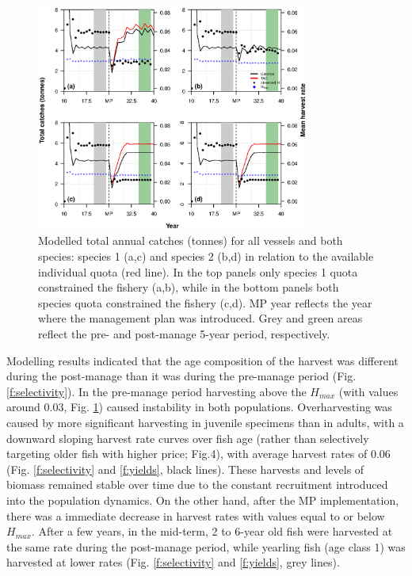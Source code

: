 \documentclass[12pt,oneline,a4paper,numbib]{ouparticle}
\numberwithin{equation}{subsection} %
\begin{document}
\begin{figure}[!ht]
\centering
\includegraphics[width=0.8\textwidth]{Figures/Catches.eps} 
\caption{Modelled total annual catches (tonnes) for all vessels and both species: species 1 (a,c) and species 2 (b,d) in relation to the available individual quota (red line). In the top panels only species 1 quota constrained the fishery (a,b), while in the bottom panels both species quota constrained the fishery (c,d). MP year reflects the year where the management plan was introduced. Grey and green areas reflect the pre- and post-manage 5-year period, respectively.}
\label{f:catches}
\end{figure}

Modelling results indicated that the age composition of the harvest was different during the post-manage than it was during the pre-manage period (Fig. \ref{f:selectivity}). In the pre-manage period harvesting above the $H_{max}$ (with values around 0.03, Fig. \ref{f:catches}) caused instability in both populations. Overharvesting was caused by more significant harvesting in juvenile specimens than in adults, with a downward sloping harvest rate curves over fish age (rather than selectively targeting older fish with higher price; Fig.4), with average harvest rates of 0.06 (Fig. \ref{f:selectivity} and \ref{f:yields}, black lines). These harvests and levels of biomass remained stable over time due to the constant recruitment introduced into the population dynamics. On the other hand, after the MP implementation, there was a immediate decrease in harvest rates with values equal to or below $H_{max}$. After a few years, in the mid-term, 2 to 6-year old fish were harvested at the same rate during the post-manage period, while yearling fish (age class 1) was harvested at lower rates (Fig. \ref{f:selectivity} and \ref{f:yields}, grey lines).
\end{document}
